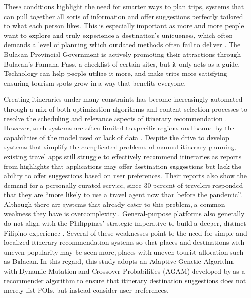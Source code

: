 These conditions highlight the need for smarter ways to plan trips, systems that can pull together all sorts of information and offer suggestions perfectly tailored to what each person likes. This is especially important as more and more people want to explore and truly experience a destination’s uniqueness, which often demands a level of planning which outdated methods often fail to deliver \parencite{Halder2022}. The Bulacan Provincial Government is actively promoting their attractions through Bulacan’s Pamana Pass, a checklist of certain sites, but it only acts as a guide. Technology can help people utilize it more, and make trips more satisfying ensuring tourism spots grow in a way that benefits everyone.

Creating itineraries under many constraints has become increasingly automated through a mix of both optimization algorithms and content selection processes to resolve the scheduling and relevance aspects of itinerary recommendation \parencite{Jewpanya2025,Liu2024}. However, such systems are often limited to specific regions and bound by the capabilities of the model used or lack of data \parencite{Cui2025,papadakis2024,Yulfihani2024}. Despite the drive to develop systems that simplify the complicated problems of manual itinerary planning, existing travel apps still struggle to effectively recommend itineraries as reports from \textcite{SkiftState2022} highlights that applications may offer destination suggestions but lack the ability to offer suggestions based on user preferences. Their reports also show the demand for a personally curated service, since 30 percent of travelers responded that they are “more likely to use a travel agent now than before the pandemic”. Although there are systems that already cater to this problem, a common weakness they have is overcomplexity \parencite{Postnikova2024}. General-purpose platforms also generally do not align with the Philippines’ strategic imperative to build a deeper, distinct Filipino experience \parencite{SkiftState2022,DOT2023}. Several of these weaknesses point to the need for simple and localized itinerary recommendation systems so that places and destinations with uneven popularity may be seen more, places with uneven tourist allocation such as Bulacan. In this regard, this study adopts an Adaptive Genetic Algorithm with Dynamic Mutation and Crossover Probabilities (AGAM)
developed by \parencite{Yochum2020} as a recommender algorithm to ensure that itinerary destination suggestions does not merely list POIs, but instead consider user preferences.

